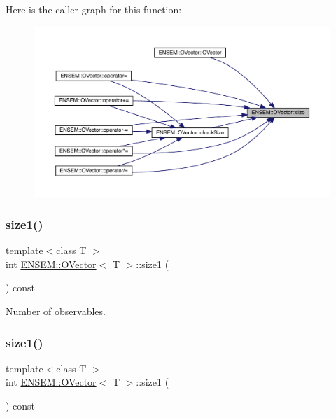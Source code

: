 Here is the caller graph for this function\+:
\nopagebreak
\begin{figure}[H]
\begin{center}
\leavevmode
\includegraphics[width=350pt]{d0/d8d/classENSEM_1_1OVector_a715979c319905eb60532815bb3c77aab_icgraph}
\end{center}
\end{figure}
\mbox{\label{classENSEM_1_1OVector_af2035852c6cefe80834b8e2a17648113}} 
\subsubsection{\texorpdfstring{size1()}{size1()}\hspace{0.1cm}{\footnotesize\ttfamily [1/3]}}
{\footnotesize\ttfamily template$<$class T $>$ \\
int \mbox{\hyperlink{classENSEM_1_1OVector}{E\+N\+S\+E\+M\+::\+O\+Vector}}$<$ T $>$\+::size1 (\begin{DoxyParamCaption}{ }\end{DoxyParamCaption}) const\hspace{0.3cm}{\ttfamily [inline]}}



Number of observables. 

\mbox{\label{classENSEM_1_1OVector_af2035852c6cefe80834b8e2a17648113}} 
\subsubsection{\texorpdfstring{size1()}{size1()}\hspace{0.1cm}{\footnotesize\ttfamily [2/3]}}
{\footnotesize\ttfamily template$<$class T $>$ \\
int \mbox{\hyperlink{classENSEM_1_1OVector}{E\+N\+S\+E\+M\+::\+O\+Vector}}$<$ T $>$\+::size1 (\begin{DoxyParamCaption}{ }\end{DoxyParamCaption}) const\hspace{0.3cm}{\ttfamily [inline]}}



